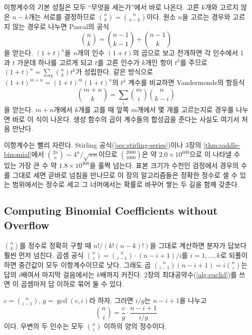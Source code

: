 이항계수의 기본 성질은 모두 ``무엇을 세는가''에서 바로 나온다. 고른 $k$개와 고르지 않은 $n-k$개는 서로를 결정하므로 $\binom nk=\binom n{n-k}$이다. 원소 $n$을 고르는 경우와 고르지 않는 경우로 나누면 Pascal의 공식
\begin{equation}
\label{eq:pascal}
\binom nk=\binom{n-1}{k-1}+\binom{n-1}k
\end{equation}
을 얻는다. $(1+t)^n$을 $n$개의 인수 $(1+t)$의 곱으로 보고 전개하면 각 인수에서 $1$과 $t$ 가운데 하나를 고르게 되고 $t$를 고른 인수가 $k$개인 항이 $t^k$를 주므로  $(1+t)^n=\sum_k\binom nkt^k$가 성립한다. 같은 방식으로 $(1+t)^{m+n}=(1+t)^m(1+t)^n$의 $t^k$ 계수를 비교하면 Vandermonde의 항등식
\begin{equation}
\label{eq:vandermonde}
\binom{m+n}k=\sum_{i}\binom mi\binom n{k-i}
\end{equation}
을 얻는다. $m+n$개에서 $k$개를 고를 때 앞쪽 $m$개에서 몇 개를 고르는지로 경우를 나누면 바로 이 식이 나온다. 생성 함수의 곱이 계수들의 합성곱을 준다는 사실도 여기서 처음 만난다.

이항계수는 빨리 자란다. Stirling 공식(\cref{sec:stirling-series})이나 3장의 \cref{thm:saddle-binomial}에서 $\binom{2n}n\sim4^n/\sqrt{\pi n}$이므로 $\binom{2000}{1000}$은 약 $2.0\times10^{600}$으로 이 나타낼 수 있는 가장 큰 수 약 $1.8\times10^{308}$을 훌쩍 넘는다. 표본 크기가 수천인 검정에서 경우의 수를 그대로 세면 곧바로 넘침을 만나므로 이 장의 알고리즘들은 정확한 정수로 셀 수 있는 범위에서는 정수로 세고 그 너머에서는 확률로 바꾸어 쌓는 두 길을 함께 갖춘다.

\subsection{Computing Binomial Coefficients without Overflow}

$\binom nk$를 정수로 정확히 구할 때 $n!/(k!(n-k)!)$을 그대로 계산하면 분자가 답보다 훨씬 먼저 넘친다. 곱셈 공식 $\binom ni=\binom n{i-1}\cdot(n-i+1)/i$를 $i=1,\dots,k$로 되풀이하면 중간값이 모두 이항계수이므로 낫다. 그래도 곱 $\binom n{i-1}(n-i+1)=i\binom ni$는 답의 $i$배여서 마지막 걸음에서는 $k$배까지 커진다. 2장의 최대공약수(\cref{alg:euclid})를 쓰면 이 곱셈마저 답 이하로 묶어 둘 수 있다.

\begin{proposition}
\label{prop:binom-gcd}
$c=\binom n{i-1}$, $g=\gcd(c,i)$라 하자. 그러면 $i/g$는 $n-i+1$을 나누고
\[
\binom ni=\frac cg\cdot\frac{n-i+1}{i/g}
\]
이다. 우변의 두 인수는 모두 $\binom ni$ 이하의 양의 정수이다.
\end{proposition}

